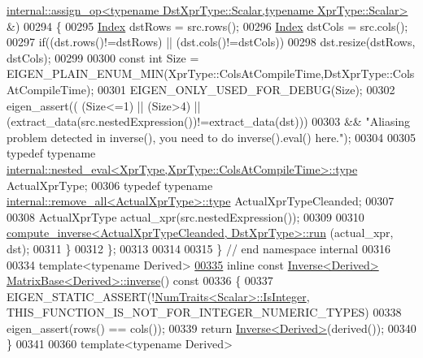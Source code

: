 \begin{DoxyCode}
      \hyperlink{struct_eigen_1_1internal_1_1assign__op}{internal::assign\_op<typename DstXprType::Scalar,typename XprType::Scalar>}
       &)
00294   \{
00295     \hyperlink{namespace_eigen_a62e77e0933482dafde8fe197d9a2cfde}{Index} dstRows = src.rows();
00296     \hyperlink{namespace_eigen_a62e77e0933482dafde8fe197d9a2cfde}{Index} dstCols = src.cols();
00297     \textcolor{keywordflow}{if}((dst.rows()!=dstRows) || (dst.cols()!=dstCols))
00298       dst.resize(dstRows, dstCols);
00299     
00300     \textcolor{keyword}{const} \textcolor{keywordtype}{int} Size = EIGEN\_PLAIN\_ENUM\_MIN(XprType::ColsAtCompileTime,DstXprType::ColsAtCompileTime);
00301     EIGEN\_ONLY\_USED\_FOR\_DEBUG(Size);
00302     eigen\_assert(( (Size<=1) || (Size>4) || (extract\_data(src.nestedExpression())!=extract\_data(dst)))
00303               && \textcolor{stringliteral}{"Aliasing problem detected in inverse(), you need to do inverse().eval() here."});
00304 
00305     \textcolor{keyword}{typedef} \textcolor{keyword}{typename} 
      \hyperlink{class_eigen_1_1internal_1_1_tensor_lazy_evaluator_writable}{internal::nested\_eval<XprType,XprType::ColsAtCompileTime>::type}
        ActualXprType;
00306     \textcolor{keyword}{typedef} \textcolor{keyword}{typename} \hyperlink{group___sparse_core___module}{internal::remove\_all<ActualXprType>::type}    
                          ActualXprTypeCleanded;
00307     
00308     ActualXprType actual\_xpr(src.nestedExpression());
00309     
00310     \hyperlink{struct_eigen_1_1internal_1_1compute__inverse}{compute\_inverse<ActualXprTypeCleanded, DstXprType>::run}
      (actual\_xpr, dst);
00311   \}
00312 \};
00313 
00314   
00315 \} \textcolor{comment}{// end namespace internal}
00316 
00334 \textcolor{keyword}{template}<\textcolor{keyword}{typename} Derived>
\hyperlink{group___core___module_a7712eb69e8ea3c8f7b8da1c44dbdeebf}{00335} \textcolor{keyword}{inline} \textcolor{keyword}{const} \hyperlink{class_eigen_1_1_inverse}{Inverse<Derived>} \hyperlink{group___core___module_a7712eb69e8ea3c8f7b8da1c44dbdeebf}{MatrixBase<Derived>::inverse}()\textcolor{keyword}{
       const}
00336 \textcolor{keyword}{}\{
00337   EIGEN\_STATIC\_ASSERT(!\hyperlink{group___core___module_struct_eigen_1_1_num_traits}{NumTraits<Scalar>::IsInteger},
      THIS\_FUNCTION\_IS\_NOT\_FOR\_INTEGER\_NUMERIC\_TYPES)
00338   eigen\_assert(rows() == cols());
00339   \textcolor{keywordflow}{return} \hyperlink{class_eigen_1_1_inverse}{Inverse<Derived>}(derived());
00340 \}
00341 
00360 \textcolor{keyword}{template}<\textcolor{keyword}{typename} Derived>

\end{DoxyCode}

